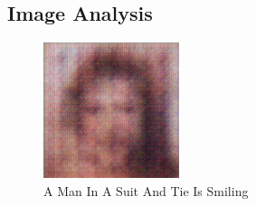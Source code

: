 \documentclass{article}%
\begin{document}
%
\subsection{Image Analysis}%
\label{subsec:ImageAnalysis}%


\begin{figure}[h!]%
\centering%
\includegraphics[width=150px]{500_fake_images/samples_5_5.png}%
\caption{A Man In A Suit And Tie Is Smiling}%
\end{figure}

%
\end{document}
